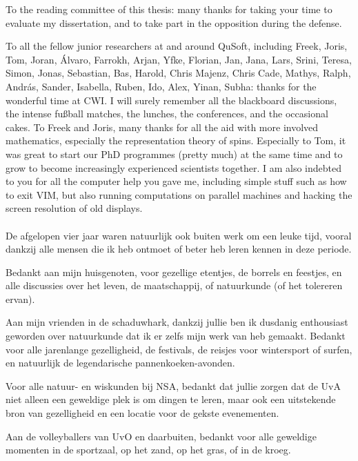 To the reading committee of this thesis: many thanks for taking your time to evaluate my dissertation, and to take part in the opposition during the defense. 


To all the fellow junior researchers at and around QuSoft, including Freek, Joris, Tom, Joran, \'{A}lvaro, Farrokh, Arjan, Yfke, Florian, Jan, Jana, Lars, Srini, Teresa, Simon, Jonas, Sebastian, Bas, Harold, Chris Majenz, Chris Cade, Mathys, Ralph, Andr\'{a}s, Sander, Isabella, Ruben, Ido, Alex, Yinan, Subha: thanks for the wonderful time at CWI. I will surely remember all the blackboard discussions, the intense fu{\ss}ball matches, the lunches, the conferences, and the occasional cakes. To Freek and Joris, many thanks for all the aid with more involved mathematics, especially the representation theory of spins. Especially to Tom, it was great to start our PhD programmes (pretty much) at the same time and to grow to become increasingly experienced scientists together. I am also indebted to you for all the computer help you gave me, including simple stuff such as how to exit VIM, but also running computations on parallel machines and hacking the screen resolution of old displays. %

%

\paragraph{}
De afgelopen vier jaar waren natuurlijk ook buiten werk om een leuke tijd, vooral dankzij alle mensen die ik heb ontmoet of beter heb leren kennen in deze periode. 
%

Bedankt aan mijn huisgenoten, voor gezellige etentjes, de borrels en feestjes, en alle discussies over het leven, de maatschappij, of natuurkunde (of het tolereren ervan). 

Aan mijn vrienden in de schaduwhark, dankzij jullie ben ik dusdanig enthousiast geworden over natuurkunde dat ik er zelfs mijn werk van heb gemaakt. Bedankt voor alle jarenlange gezelligheid, de festivals, de reisjes voor wintersport of surfen, en natuurlijk de legendarische pannenkoeken-avonden. 

Voor alle natuur- en wiskunden bij NSA, bedankt dat jullie zorgen dat de UvA niet alleen een geweldige plek is om dingen te leren, maar ook een uitstekende bron van gezelligheid en een locatie voor de gekste evenementen. 

Aan de volleyballers van UvO en daarbuiten, bedankt voor alle geweldige momenten in de sportzaal, op het zand, op het gras, of in de kroeg.  

